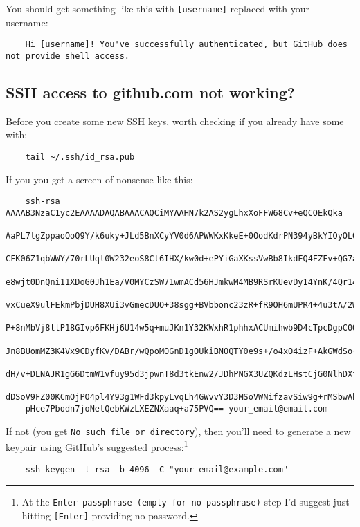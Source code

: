 You should get something like this with \texttt{[username]} replaced with your username:

\begin{verbatim}
    Hi [username]! You've successfully authenticated, but GitHub does not provide shell access.
\end{verbatim}

\subsection{SSH access to github.com not working?}

Before you create some new SSH keys, worth checking if you already have some with:

\begin{verbatim}
    tail ~/.ssh/id_rsa.pub
\end{verbatim}

If you you get a screen of nonsense like this:

\begin{verbatim}
    ssh-rsa AAAAB3NzaC1yc2EAAAADAQABAAACAQCiMYAAHN7k2AS2ygLhxXoFFW68Cv+eQCOEkQka
    AaPL7lgZppaoQoQ9Y/k6uky+JLd5BnXCyYV0d6APWWKxKkeE+0OodKdrPN394yBkYIQyOL0Eqsj9
    CFK06Z1qbWWY/70rLUql0W232eoS8Ct6IHX/kw0d+ePYiGaXKssVwBb8IkdFQ4FZFv+QG7aZHCLW
    e8wjt0DnQni11XDoG0Jh1Ea/V0MYCzSW71wmACd56HJmkwM4MB9RSrKUevDy14YnK/4Qr14WdDn4
    vxCueX9ulFEkmPbjDUH8XUi3vGmecDUO+38sgg+BVbbonc23zR+fR9OH6mUPR4+4u3tA/2W8RmJN
    P+8nMbVj8ttP18GIvp6FKHj6U14w5q+muJKn1Y32KWxhR1phhxACUmihwb9D4cTpcDgpC0QsLKsh
    Jn8BUomMZ3K4Vx9CDyfKv/DABr/wQpoMOGnD1gOUkiBNOQTY0e9s+/o4xO4izF+AkGWdSo+FrTEB
    dH/v+DLNAJR1gG6DtmW1vfuy95d3jpwnT8d3tkEnw2/JDhPNGX3UZQKdzLHstCjG0NlhDXf+M4rq
    dDSoV9FZ00KCmOjPO4pl4Y93g1WFd3kpyLvqLh4GWvvY3D3MSoVWNifzavSiw9g+rMSbwAh8uUTu
    pHce7Pbodn7joNetQebKWzLXEZNXaaq+a75PVQ== your_email@email.com
\end{verbatim}

If not (you get \texttt{No such file or directory}), then you'll need to generate a new keypair using \href{https://help.github.com/en/articles/generating-a-new-ssh-key-and-adding-it-to-the-ssh-agent}{GitHub's suggested process}:\footnote{At the \texttt{Enter passphrase (empty for no passphrase)} step I'd suggest just hitting \texttt{[Enter]} providing no password.}

\begin{verbatim}
    ssh-keygen -t rsa -b 4096 -C "your_email@example.com"
\end{verbatim}

